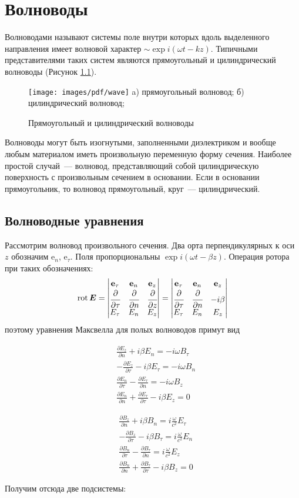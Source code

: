 \documentclass[a4paper,14pt]{extreport} %
\newcommand{\df}[1]{\cfrac{\partial}{\partial #1}}
\newcommand{\dff}[2]{\frac{\partial #1}{\partial #2}}
\renewcommand{\vec}[1]{\boldsymbol{#1}}
\newcommand{\ort}[1]{\boldsymbol{\mathrm{e}}_#1}
\newcommand{\rot}{\mathrm{rot}\,}
\newcommand{\matrixt}[2]{\begin{#1matrix} #2\end{#1matrix}}
\newcommand{\matrixrotr}[7]{\begin{#1matrix} \ort{#2} & \ort{#3} & \ort{#4} \\ \df{#2} & \df{#3} & \df{#4} \\ #5 & #6 & #7 \end{#1matrix}}
\begin{document}
	\chapter{Волноводы}
	
	Волноводами называют системы поле внутри которых вдоль выделенного направления имеет волновой характер $\sim\exp i(\omega t - kz)$. Типичными представителями таких систем являются прямоугольный и цилиндрический волноводы (Рисунок \ref{figw}).
	
	\begin{figure}[h]
		\texttt{[image: images/pdf/wave]}
		a) прямоугольный волновод;
		б) цилиндрический волновод;
		\caption{Прямоугольный и цилиндрический волноводы}
		\label{figw}
	\end{figure}
	
	Волноводы могут быть изогнутыми, заполненными диэлектриком и вообще любым материалом иметь произвольную переменную форму сечения. Наиболее простой случай~--- волновод, представляющий собой цилиндрическую поверхность с произвольным сечением в основании. Если в основании прямоугольник, то волновод прямоугольный, круг~--- цилиндрический.
	
	\section{Волноводные уравнения}
	
	Рассмотрим волновод произвольного сечения. Два орта перпендикулярных к оси $z$ обозначим $\ort{n}$, $\ort{\tau}$. Поля пропорциональны $\exp i(\omega t - \beta z)$. Операция ротора при таких обозначениях:
	\begin{equation*}
		\rot \vec{E} = 
		\matrixrotr{v}{\tau}{n}{z}{E_\tau}{E_n}{E_z} =
		\matrixt{v}{\ort{\tau} & \ort{n} & \ort{z} \\ \df{\tau} & \df{n} & -i\beta \\ E_\tau & E_n & E_z}
	\end{equation*}
	поэтому уравнения Максвелла для полых волноводов примут вид
	
	\parbox{0.5\textwidth}{
		\begin{align*}
		& \dff{E_z}{n} + i \beta E_n = - i \omega B_\tau \\
		& - \dff{E_z}{\tau} - i \beta E_\tau = - i \omega B_n \\
		& \dff{E_n}{\tau} - \dff{E_\tau}{n} = - i \omega B_z \\
		& \dff{E_n}{n} + \dff{E_\tau}{\tau} - i \beta E_z = 0
		\end{align*}
	}\parbox{0.5\textwidth}{
		\begin{align*}
		& \dff{B_z}{n} + i \beta B_n = i \frac{\omega}{c^2} E_\tau \\
		& - \dff{B_z}{\tau} - i \beta B_\tau = i \frac{\omega}{c^2} E_n \\
		& \dff{B_n}{\tau} - \dff{B_\tau}{n} = i \frac{\omega}{c^2} E_z \\
		& \dff{B_n}{n} + \dff{B_\tau}{\tau} - i \beta B_z = 0
		\end{align*}
	}
	Получим отсюда две подсистемы:
	
\end{document}
